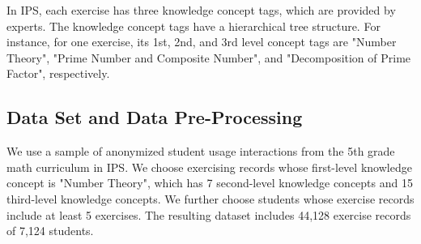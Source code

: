 \documentclass{edm_template}
\begin{document}



In IPS, each exercise has three knowledge concept tags, which are provided by experts. The knowledge concept tags have a hierarchical tree structure. For instance, for one exercise, its 1st, 2nd, and 3rd level concept tags are "Number Theory", "Prime Number and Composite Number", and "Decomposition of Prime Factor", respectively. 





\subsection{Data Set and Data Pre-Processing}

We use a sample of anonymized student usage interactions from the 5th grade math curriculum in IPS.
We choose exercising records whose first-level knowledge concept is "Number Theory", which has 7 second-level knowledge concepts and 15 third-level knowledge concepts. We further choose students whose exercise records include at least 5 exercises. The resulting dataset includes 44,128 exercise records of 7,124 students.
\end{document}
